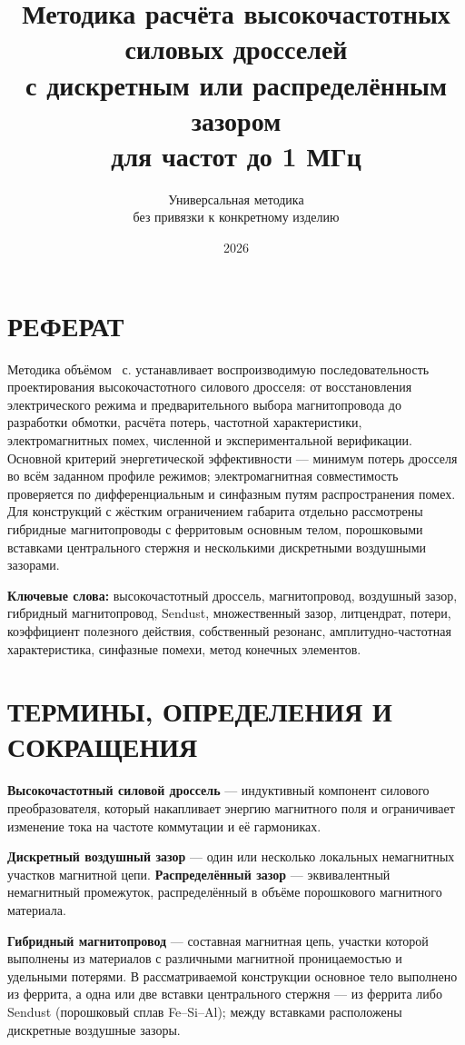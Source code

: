 \documentclass[14pt,a4paper]{extarticle}
\title{Методика расчёта высокочастотных силовых дросселей\\
с дискретным или распределённым зазором\\
для частот до 1 МГц}
\author{Универсальная методика\\без привязки к конкретному изделию}
\date{2026}
\begin{document}
\maketitle
\thispagestyle{empty}
\newpage

\section*{РЕФЕРАТ}

Методика объёмом \pageref{LastPage}~с. устанавливает
воспроизводимую последовательность проектирования высокочастотного силового
дросселя: от восстановления электрического режима и предварительного выбора
магнитопровода до разработки обмотки, расчёта потерь, частотной характеристики,
электромагнитных помех, численной и экспериментальной верификации. Основной
критерий энергетической эффективности --- минимум потерь дросселя во всём
заданном профиле режимов; электромагнитная совместимость проверяется по
дифференциальным и синфазным путям распространения помех. Для конструкций с
жёстким ограничением габарита отдельно рассмотрены гибридные магнитопроводы с
ферритовым основным телом, порошковыми вставками центрального стержня и
несколькими дискретными воздушными зазорами.

\noindent\textbf{Ключевые слова:} высокочастотный дроссель, магнитопровод,
воздушный зазор, гибридный магнитопровод, Sendust, множественный зазор,
литцендрат, потери, коэффициент полезного действия, собственный резонанс,
амплитудно-частотная характеристика, синфазные помехи, метод конечных элементов.

\newpage
\tableofcontents
\newpage

\section*{ТЕРМИНЫ, ОПРЕДЕЛЕНИЯ И СОКРАЩЕНИЯ}

\textbf{Высокочастотный силовой дроссель} --- индуктивный компонент силового
преобразователя, который накапливает энергию магнитного поля и ограничивает
изменение тока на частоте коммутации и её гармониках.

\textbf{Дискретный воздушный зазор} --- один или несколько локальных
немагнитных участков магнитной цепи. \textbf{Распределённый зазор} ---
эквивалентный немагнитный промежуток, распределённый в объёме порошкового
магнитного материала.

\textbf{Гибридный магнитопровод} --- составная магнитная цепь, участки которой
выполнены из материалов с различными магнитной проницаемостью и удельными
потерями. В рассматриваемой конструкции основное тело выполнено из феррита, а
одна или две вставки центрального стержня --- из феррита либо Sendust
(порошковый сплав Fe--Si--Al); между вставками расположены дискретные воздушные
зазоры.
\end{document}
